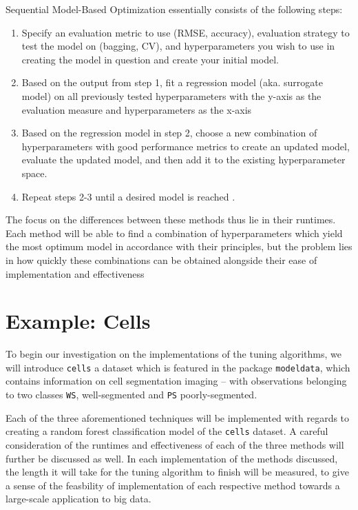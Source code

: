\documentclass[12pt]{article}
\begin{document}
Sequential Model-Based Optimization essentially consists of the
following steps:

\begin{enumerate}
\def\labelenumi{\arabic{enumi})}
\item
  Specify an evaluation metric to use (RMSE, accuracy), evaluation
  strategy to test the model on (bagging, CV), and hyperparameters you
  wish to use in creating the model in question and create your initial
  model.
\item
  Based on the output from step 1, fit a regression model (aka.
  surrogate model) on all previously tested hyperparameters with the
  y-axis as the evaluation measure and hyperparameters as the x-axis
\item
  Based on the regression model in step 2, choose a new combination of
  hyperparameters with good performance metrics to create an updated
  model, evaluate the updated model, and then add it to the existing
  hyperparameter space.
\item
  Repeat steps 2-3 until a desired model is reached \citep{Probst2019}.
\end{enumerate}

The focus on the differences between these methods thus lie in their
runtimes. Each method will be able to find a combination of
hyperparameters which yield the most optimum model in accordance with
their principles, but the problem lies in how quickly these combinations
can be obtained alongside their ease of implementation and effectiveness
\citep{Probst2019}

\newpage

\hypertarget{example-cells}{%
\section{Example: Cells}\label{example-cells}}

\label{sec:cells}

To begin our investigation on the implementations of the tuning
algorithms, we will introduce \texttt{cells} a dataset which is featured
in the package \texttt{modeldata}, which contains information on cell
segmentation imaging -- with observations belonging to two classes
\texttt{WS}, well-segmented and \texttt{PS} poorly-segmented.

Each of the three aforementioned techniques will be implemented with
regards to creating a random forest classification model of the
\texttt{cells} dataset. A careful consideration of the runtimes and
effectiveness of each of the three methods will further be discussed as
well. In each implementation of the methods discussed, the length it
will take for the tuning algorithm to finish will be measured, to give a
sense of the feasbility of implementation of each respective method
towards a large-scale application to big data.
\end{document}

